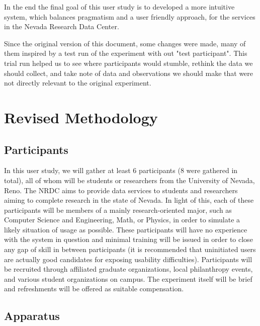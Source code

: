 \documentclass{article}
\begin{document}
In the end the final goal of this user study is to developed a more intuitive system, which balances pragmatism and a user friendly approach, for the services in the Nevada Research Data Center.

Since the original version of this document, some changes were made, many of them inspired by a test run of the experiment with out "test participant". This trial run helped us to see where participants would stumble, rethink the data we should collect, and take note of data and observations we should make that were not directly relevant to the original experiment.

%
%
\section{Revised Methodology}
%
\subsection{Participants}
In this user study, we will gather at least 6 participants (8 were gathered in total), all of whom will be students or researchers from the University of Nevada, Reno. The NRDC aims to provide data services to students and researchers aiming to complete research in the state of Nevada. In light of this, each of these participants will be members of a mainly research-oriented major, such as Computer Science and Engineering, Math, or Physics, in order to simulate a likely situation of usage as possible. These participants will have no experience with the system in question and minimal training will be issued in order to close any gap of skill in between participants (it is recommended that uninitiated users are actually good candidates for exposing usability difficulties\cite{dontmakemethink}). Participants will be recruited through affiliated graduate organizations, local philanthropy events, and various student organizations on campus. The experiment itself will be brief and refreshments will be offered as suitable compensation.

%
\subsection{Apparatus}
\end{document}

